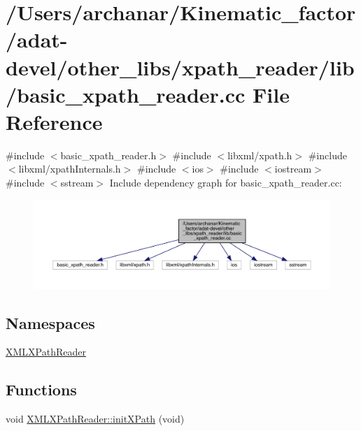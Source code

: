 \hypertarget{adat-devel_2other__libs_2xpath__reader_2lib_2basic__xpath__reader_8cc}{}\section{/\+Users/archanar/\+Kinematic\+\_\+factor/adat-\/devel/other\+\_\+libs/xpath\+\_\+reader/lib/basic\+\_\+xpath\+\_\+reader.cc File Reference}
\label{adat-devel_2other__libs_2xpath__reader_2lib_2basic__xpath__reader_8cc}
{\ttfamily \#include $<$basic\+\_\+xpath\+\_\+reader.\+h$>$}\newline
{\ttfamily \#include $<$libxml/xpath.\+h$>$}\newline
{\ttfamily \#include $<$libxml/xpath\+Internals.\+h$>$}\newline
{\ttfamily \#include $<$ios$>$}\newline
{\ttfamily \#include $<$iostream$>$}\newline
{\ttfamily \#include $<$sstream$>$}\newline
Include dependency graph for basic\+\_\+xpath\+\_\+reader.\+cc\+:
\nopagebreak
\begin{figure}[H]
\begin{center}
\leavevmode
\includegraphics[width=350pt]{da/d0d/adat-devel_2other__libs_2xpath__reader_2lib_2basic__xpath__reader_8cc__incl}
\end{center}
\end{figure}
\subsection*{Namespaces}
\begin{DoxyCompactItemize}
\item 
 \mbox{\hyperlink{namespaceXMLXPathReader}{X\+M\+L\+X\+Path\+Reader}}
\end{DoxyCompactItemize}
\subsection*{Functions}
\begin{DoxyCompactItemize}
\item 
void \mbox{\hyperlink{namespaceXMLXPathReader_a3eaf7514c0fa46eb783802d88bbebb97}{X\+M\+L\+X\+Path\+Reader\+::init\+X\+Path}} (void)
\end{DoxyCompactItemize}
